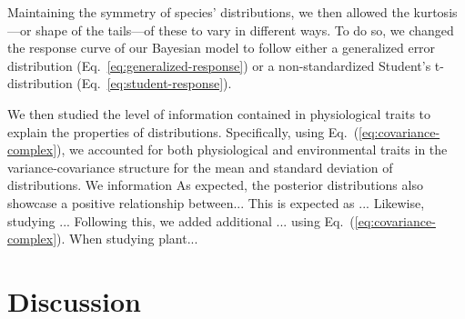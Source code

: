 \documentclass[11pt, a4paper]{article}
\begin{document}
Maintaining the symmetry of species' distributions, we then allowed the kurtosis---or shape of the tails---of these to vary in different ways. To do so, we changed the response curve of our Bayesian model to follow either a generalized error distribution (Eq.~\ref{eq:generalized-response}) or a non-standardized Student's t-distribution (Eq.~\ref{eq:student-response}).


We then studied the level of information contained in physiological traits to explain the properties of distributions. Specifically, using Eq.~(\ref{eq:covariance-complex}), we accounted for both physiological and environmental traits in the variance-covariance structure for the mean and standard deviation of distributions. We information 
As expected, the posterior distributions also showcase a positive relationship between... This is expected as ... Likewise, studying ... Following this, we added additional ... using Eq.~(\ref{eq:covariance-complex}). When studying plant... 



\section*{Discussion}
% 
\end{document}

